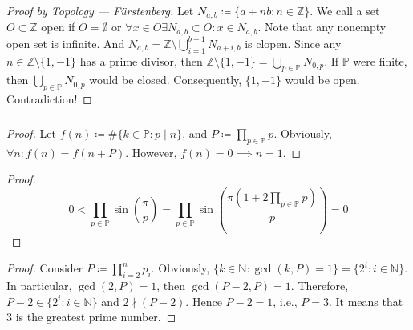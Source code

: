 \documentclass[UTF8,11pt,colorlinks,compress,openany]{beamer}%
\begin{document}
\begin{frame}\frametitle{}
\begin{proof}[Proof by Topology --- F\"urstenberg]
Let $N_{a,b}\coloneqq \{a+nb: n\in\mathbb{Z}\}$. We call a set $O\subset\mathbb{Z}$ open if $O=\emptyset$ or $\forall x\in O\exists N_{a,b}\subset O: x \in N_{a,b}$. Note that any nonempty open set is infinite. And $N_{a,b}=\mathbb{Z}\setminus\bigcup_{i=1}^{b-1}N_{a+i,b}$ is clopen. Since any $n\in\mathbb{Z}\setminus\{1,-1\}$ has a prime divisor, then $\mathbb{Z}\setminus\{1,-1\}=\bigcup_{p \in\mathbb{P}}N_{0,p}$. If $\mathbb{P}$ were finite, then $\bigcup_{p \in\mathbb{P}}N_{0,p}$ would be closed. Consequently, $\{1,-1\}$ would be open. Contradiction!
\end{proof}
\end{frame}

\begin{frame}\frametitle{}
\begin{proof}
Let $f(n)\coloneqq \#\{k\in\mathbb{P}: p\mid n\}$, and $P\coloneqq \prod\limits_{p\in\mathbb{P}} p$. Obviously, $\forall n: f(n)=f(n+P)$. However, $f(n)=0\implies n=1$.
\end{proof}
\begin{proof}
\[0<\prod\limits_{p\in\mathbb{P}}\sin\left(\frac{\pi}{p}\right)=\prod\limits_{p\in\mathbb{P}}\sin\left(\frac{\pi\left(1+2\prod\limits_{p\in\mathbb{P}}p\right)}{p}\right)=0\]
\end{proof}
\begin{proof}
Consider $P\coloneqq \prod\limits_{i=2}^n p_i$. Obviously, $\{k\in\mathbb{N}: \gcd(k,P)=1\}=\{2^i: i\in\mathbb{N}\}$. In particular, $\gcd(2,P)=1$, then $\gcd(P-2,P)=1$. Therefore, $P-2\in\{2^i: i\in\mathbb{N}\}$ and $2\nmid(P-2)$. Hence $P-2=1$, i.e., $P=3$. It means that $3$ is the greatest prime number.
\end{proof}
\end{frame}
\end{document}
